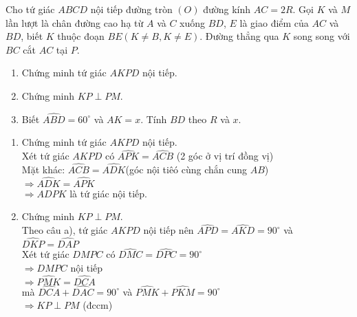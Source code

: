 \begin{ex}%
 Cho tứ giác $ABCD$ nội tiếp đường tròn $(O)$ đường kính $AC=2R$. Gọi $K$ và $M$ lần lượt là chân đường cao hạ từ $A$ và $C$ xuống $BD$, $E$ là giao điểm của $AC$ và $BD$, biết $K$ thuộc đoạn $BE(K \neq B,K\neq E)$. Đường thẳng qua $K$ song song với $BC$ cắt $AC$ tại $P$.
  \begin{enumerate}
        \item Chứng minh tứ giác $AKPD$ nội tiếp.
        \item Chứng minh $KP \perp PM$.
        \item Biết $\widehat{ABD}=60^ \circ$ và $AK=x$. Tính $BD$ theo $R$ và $x$.
    \end{enumerate}
\loigiai
    {
    \begin{center}
\end{center}
    	
	\begin{enumerate}
        \item Chứng minh tứ giác $AKPD$ nội tiếp.\\
        Xét tứ giác $AKPD$ có $\widehat{APK}=\widehat{ACB}$ (2 góc ở vị trí đồng vị)\\
        Mặt khác: $\widehat{ACB}=\widehat{ADK}$(góc nội tiêó cùng chắn cung $AB$)\\
        $\Rightarrow \widehat{ADK}=\widehat{APK}$\\
        $\Rightarrow ADPK$ là tứ giác nội tiếp.        
        \item Chứng minh $KP \perp PM$.\\
        Theo câu a), tứ giác $AKPD$ nội tiếp nên $\widehat{APD}=\widehat{AKD}=90^ \circ$ và $\widehat{DKP}=\widehat{DAP}$\\
        Xét tứ giác $DMPC$ có $\widehat{DMC}=\widehat{DPC}=90^ \circ$\\
        $\Rightarrow DMPC$ nội tiếp\\
        $\Rightarrow \widehat{PMK}=\widehat{DCA}$\\
        mà $\widehat{DCA}+\widehat{DAC}=90^ \circ$ và $\widehat{PMK}+\widehat{PKM}=90^ \circ$\\
        $\Rightarrow KP \perp PM$ (đccm) 
               

\end{enumerate}}
\end{ex}
